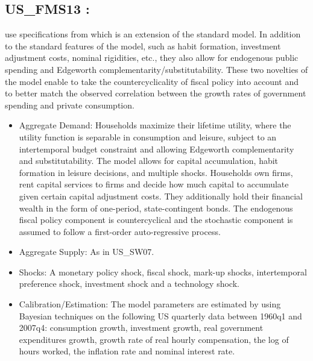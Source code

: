 \documentclass[11pt,a4paper]{article}
\begin{document}
\begin{itemize}
	\end{itemize}
	
	
	
	\subsection{US\_FMS13 : \cite{Feveetal2013}}
	\label{USFMS13} 
	\cite{Feveetal2013} use specifications from \cite{Justinianoetal2011} which is an extension of the standard \cite{SmetsWouters2007} model. In addition to the standard features of the model, such as habit formation, investment adjustment costs, nominal rigidities, etc., they also allow for endogenous public spending and Edgeworth complementarity/substitutability. These two novelties of the model enable to take the countercyclicality of fiscal policy into account and to better match the observed correlation between the growth rates of government spending and private consumption.
	\begin{itemize}
		\item Aggregate Demand: Households maximize their lifetime utility, where the utility function is separable in consumption and leisure, subject to an intertemporal budget constraint and allowing Edgeworth complementarity and substitutability. The model allows for capital accumulation, habit formation in leisure decisions, and multiple shocks. Households own firms, rent capital services to firms and decide how much capital to accumulate given certain capital adjustment costs. They additionally hold their financial wealth in the form of one-period, state-contingent bonds. The endogenous fiscal policy component is countercyclical and the stochastic component is assumed to follow a first-order auto-regressive process.
		\item Aggregate Supply: As in US\_SW07.
		\item Shocks: A monetary policy shock, fiscal shock, mark-up shocks, intertemporal preference shock, investment shock and a technology shock.
		\item Calibration/Estimation: The model parameters are estimated by using Bayesian techniques on the following US quarterly data between 1960q1 and 2007q4: consumption growth, investment growth, real government expenditures growth, growth rate of real hourly compensation, the log of hours worked, the inflation rate and nominal interest rate.
	\end{itemize}
	
\end{document}
